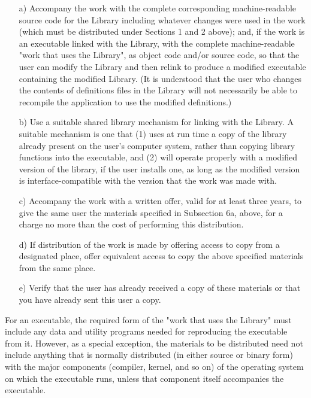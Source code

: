 {\begin{itemize}
  \begin{itemize}
  \item [a)] Accompany the work with the complete corresponding
    machine-readable source code for the Library including whatever
    changes were used in the work (which must be distributed under
    Sections 1 and 2 above); and, if the work is an executable linked
    with the Library, with the complete machine-readable "work that
    uses the Library", as object code and/or source code, so that the
    user can modify the Library and then relink to produce a modified
    executable containing the modified Library.  (It is understood
    that the user who changes the contents of definitions files in the
    Library will not necessarily be able to recompile the application
    to use the modified definitions.)
    
  \item [b)] Use a suitable shared library mechanism for linking with
    the Library.  A suitable mechanism is one that (1) uses at run
    time a copy of the library already present on the user's computer
    system, rather than copying library functions into the executable,
    and (2) will operate properly with a modified version of the
    library, if the user installs one, as long as the modified version
    is interface-compatible with the version that the work was made
    with.
    
  \item [c)] Accompany the work with a written offer, valid for at least
    three years, to give the same user the materials specified in
    Subsection 6a, above, for a charge no more than the cost of
    performing this distribution.
    
  \item [d)] If distribution of the work is made by offering access to
    copy from a designated place, offer equivalent access to copy the
    above specified materials from the same place.
    
  \item [e)] Verify that the user has already received a copy of these
    materials or that you have already sent this user a copy.
  \end{itemize}
  
  For an executable, the required form of the "work that uses the
  Library" must include any data and utility programs needed for
  reproducing the executable from it.  However, as a special
  exception, the materials to be distributed need not include anything
  that is normally distributed (in either source or binary form) with
  the major components (compiler, kernel, and so on) of the operating
  system on which the executable runs, unless that component itself
  accompanies the executable.
  

\end{itemize}}
